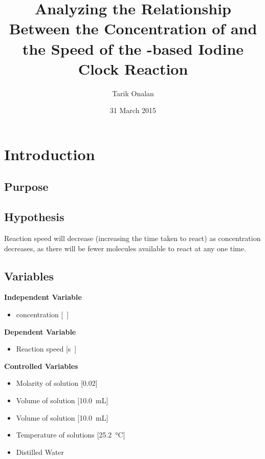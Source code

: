 \documentclass[a4paper]{article}
\title{Analyzing the Relationship Between the Concentration of \ce{KIO3} and the
Speed of the \ce{NaHSO3}-based Iodine Clock Reaction}
\date{31 March 2015}
\author{Tarik Onalan}
\begin{document}
    \maketitle
    \section{Introduction}
        \subsection{Purpose}
        \subsection{Hypothesis}
            Reaction speed will decrease (increasing the time taken to react) as 
            concentration decreases, as there will be fewer  molecules available
            to react at any one time.
        \subsection{Variables}
            \textbf{Independent Variable}
            \begin{itemize}
                \item {} concentration [\si\Molar]
            \end{itemize}
            \textbf{Dependent Variable}
            \begin{itemize}
                \item Reaction speed [\si\s]
            \end{itemize}
            \textbf{Controlled Variables}
            \begin{itemize}
                \item Molarity of  solution [\SI{0.02}{\Molar}]
                \item Volume of  solution [\SI{10.0}{\mL}]
                \item Volume of  solution [\SI{10.0}{\mL}]
                \item Temperature of solutions [\SI{25.2}{\celsius}]
                \item Distilled Water
            \end{itemize}
\end{document}
